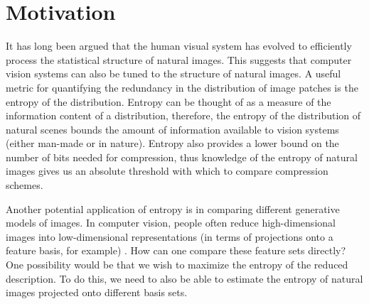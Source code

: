 \documentclass[10pt,twocolumn,letterpaper]{article}
\begin{document}
\section{Motivation}
It has long been argued \cite{barlow} that the human visual system has evolved to efficiently process the statistical structure of natural images. This suggests that computer vision systems can also be tuned to the structure of natural images. A useful metric for quantifying the redundancy in the distribution of image patches is the entropy of the distribution. Entropy can be thought of as a measure of the information content of a distribution, therefore, the entropy of the distribution of natural scenes bounds the amount of information available to vision systems (either man-made or in nature). Entropy also provides a lower bound on the number of bits needed for compression, thus knowledge of the entropy of natural images gives us an absolute threshold with which to compare compression schemes.




Another potential application of entropy is in comparing different generative models of images. In computer vision, people often reduce high-dimensional images into low-dimensional representations (in terms of projections onto a feature basis, for example) \cite{bethge}.  How can one compare these feature sets directly? One possibility would be that we wish to maximize the entropy of the reduced description. To do this, we need to also be able to estimate the entropy of natural images projected onto different basis sets.

\end{document}
